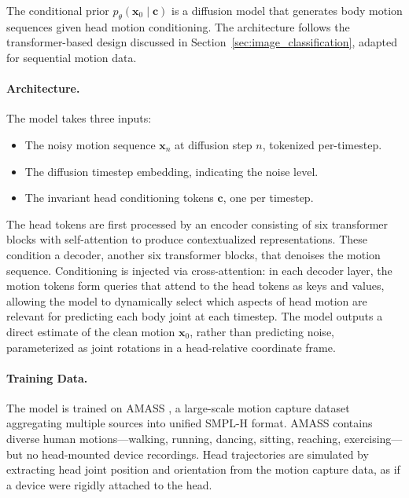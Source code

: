 \documentclass[../../book-main.tex]{subfiles}
\begin{document}
The conditional prior $p_\theta(\boldsymbol{x}_0 \mid \boldsymbol{c})$ is a
diffusion model that generates body motion sequences given head
motion conditioning. The architecture follows the transformer-based
design discussed in Section~\ref{sec:image_classification}, adapted
for sequential motion data.

\paragraph{Architecture.}
The model takes three inputs:
\begin{itemize}
\item The noisy motion sequence $\boldsymbol{x}_n$ at diffusion step
$n$, tokenized per-timestep.
\item The diffusion timestep embedding, indicating the noise level.
\item The invariant head conditioning tokens $\boldsymbol{c}$, one per timestep.
\end{itemize}

The head tokens are first processed by an encoder consisting of six
transformer blocks with self-attention to produce contextualized
representations. These condition a decoder, another six transformer
blocks, that denoises the motion sequence. Conditioning is injected
via cross-attention: in each decoder layer, the motion tokens form
queries that attend to the head tokens as keys and values, allowing
the model to dynamically select which aspects of head motion are
relevant for predicting each body joint at each timestep. The model
outputs a direct estimate of the clean motion $\boldsymbol{x}_0$, rather
than predicting noise, parameterized as joint rotations in a
head-relative coordinate frame.

\paragraph{Training Data.}
The model is trained on AMASS \citep{mahmood2019amass}, a large-scale
motion capture dataset aggregating multiple sources into unified
SMPL-H format. AMASS contains diverse human motions---walking,
running, dancing, sitting, reaching, exercising---but no head-mounted
device recordings. Head trajectories are simulated by extracting head
joint position and orientation from the motion capture data, as if a
device were rigidly attached to the head.
\end{document}
